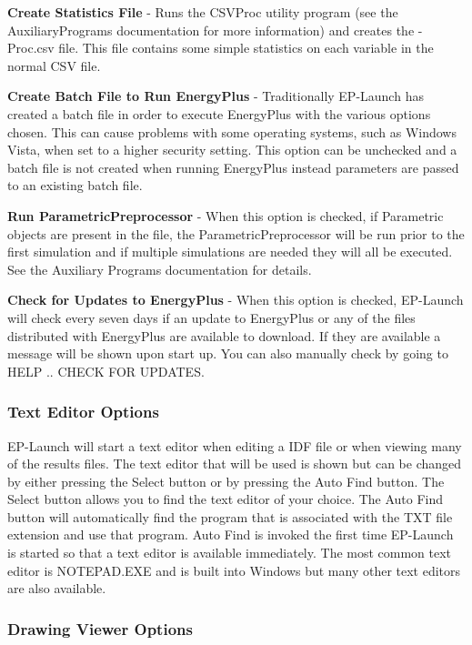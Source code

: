 \textbf{Create Statistics File} - Runs the CSVProc utility program (see the AuxiliaryPrograms documentation for more information) and creates the -Proc.csv file. This file contains some simple statistics on each variable in the normal CSV file.

\textbf{Create Batch File to Run EnergyPlus} - Traditionally EP-Launch has created a batch file in order to execute EnergyPlus with the various options chosen. This can cause problems with some operating systems, such as Windows Vista, when set to a higher security setting. This option can be unchecked and a batch file is not created when running EnergyPlus instead parameters are passed to an existing batch file.

\textbf{Run ParametricPreprocessor} - When this option is checked, if Parametric objects are present in the file, the ParametricPreprocessor will be run prior to the first simulation and if multiple simulations are needed they will all be executed. See the Auxiliary Programs documentation for details.

\textbf{Check for Updates to EnergyPlus} - When this option is checked, EP-Launch will check every seven days if an update to EnergyPlus or any of the files distributed with EnergyPlus are available to download. If they are available a message will be shown upon start up. You can also manually check by going to HELP .. CHECK FOR UPDATES.

\subsubsection{Text Editor Options}\label{text-editor-options}

EP-Launch will start a text editor when editing a IDF file or when viewing many of the results files. The text editor that will be used is shown but can be changed by either pressing the Select button or by pressing the Auto Find button. The Select button allows you to find the text editor of your choice. The Auto Find button will automatically find the program that is associated with the TXT file extension and use that program. Auto Find is invoked the first time EP-Launch is started so that a text editor is available immediately. The most common text editor is NOTEPAD.EXE and is built into Windows but many other text editors are also available.

\subsubsection{Drawing Viewer Options}\label{drawing-viewer-options}

